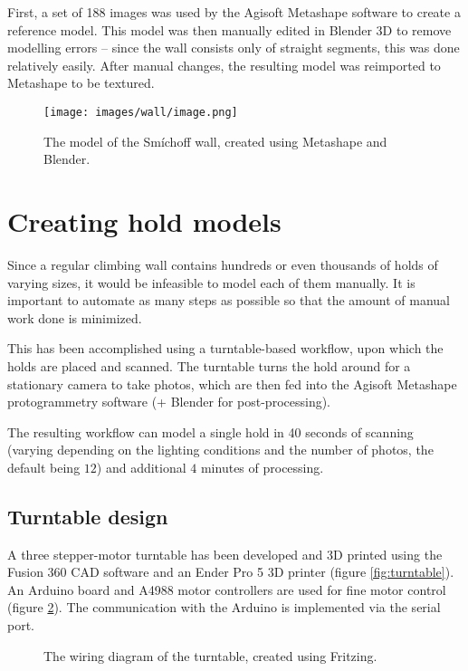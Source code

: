 First, a set of 188 images was used by the Agisoft Metashape software to create a reference model.
This model was then manually edited in Blender 3D to remove modelling errors -- since the wall consists only of straight segments, this was done relatively easily.
After manual changes, the resulting model was reimported to Metashape to be textured.

\begin{figure}[t]
	\centering
	\texttt{[image: images/wall/image.png]}
	\caption{The model of the Smíchoff wall, created using Metashape and Blender.}
	\label{fig:model}
\end{figure}


\section{Creating hold models}
Since a regular climbing wall contains hundreds or even thousands of holds of varying sizes, it would be infeasible to model each of them manually.
It is important to automate as many steps as possible so that the amount of manual work done is minimized.

This has been accomplished using a turntable-based workflow, upon which the holds are placed and scanned.
The turntable turns the hold around for a stationary camera to take photos, which are then fed into the Agisoft Metashape protogrammetry software (+ Blender for post-processing).

The resulting workflow can model a single hold in 40 seconds of scanning (varying depending on the lighting conditions and the number of photos, the default being $12$) and additional $4$ minutes of processing.

\subsection{Turntable design}
A three stepper-motor turntable has been developed and 3D printed using the Fusion 360 CAD software and an Ender Pro 5 3D printer (figure \ref{fig:turntable}).
An Arduino board and A4988 motor controllers are used for fine motor control (figure \ref{fig:wiring}).
The communication with the Arduino is implemented via the serial port.

\begin{figure}
	\centering
	
	\caption{The wiring diagram of the turntable, created using Fritzing.}
	\label{fig:wiring}
\end{figure}

